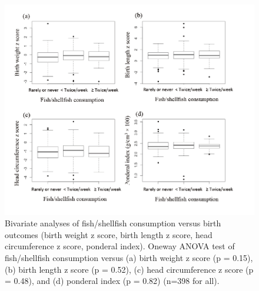 \begin{figure}
  \centering
    \label{fig:Fig333}
  \includegraphics[scale=1]{Figures/Fig333.pdf}
  \caption[Bivariate analyses of fish/shellfish consumption versus birth outcomes (birth weight z score, birth length z score, head circumference z score, ponderal index)]{Bivariate analyses of fish/shellfish consumption versus birth outcomes (birth weight z score, birth length z score, head circumference z score, ponderal index). Oneway ANOVA test of fish/shellfish consumption versus (a) birth weight z score (p = 0.15), (b) birth length z score (p = 0.52), (c) head circumference z score (p = 0.48), and (d) ponderal index (p = 0.82) (n=398 for all).}
\end{figure}

